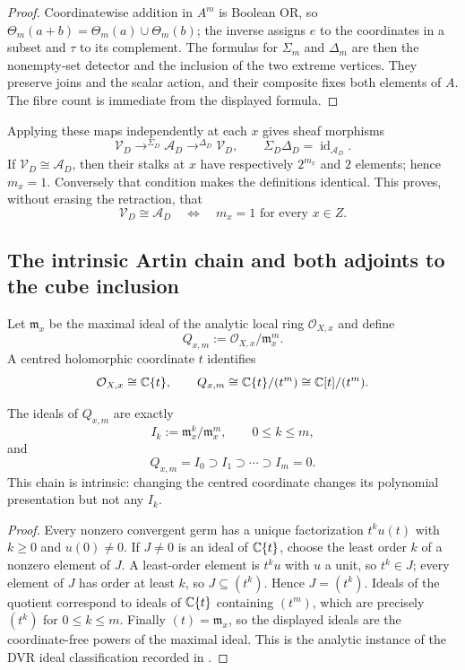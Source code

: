 \begin{proof}
Coordinatewise addition in $A^m$ is Boolean OR, so
$\Theta_m(a+b)=\Theta_m(a)\cup\Theta_m(b)$; the inverse assigns $e$ to the
coordinates in a subset and $\tau$ to its complement.  The formulas for
$\Sigma_m$ and $\Delta_m$ are then the nonempty-set detector and the inclusion
of the two extreme vertices.  They preserve joins and the scalar action, and
their composite fixes both elements of $A$.  The fibre count is immediate from
the displayed formula.
\end{proof}

Applying these maps independently at each $x$ gives sheaf morphisms
\[
 \mathcal V_D\mathop{\longrightarrow}^{\Sigma_D}\mathcal A_D
 \mathop{\longrightarrow}^{\Delta_D}\mathcal V_D,
 \qquad
 \Sigma_D\Delta_D=\operatorname{id}_{\mathcal A_D}.
\]
If $\mathcal V_D\cong\mathcal A_D$, then their stalks at $x$ have respectively
$2^{m_x}$ and $2$ elements; hence $m_x=1$.  Conversely that condition makes
the definitions identical.  This proves, without erasing the retraction, that
\[
 \mathcal V_D\cong\mathcal A_D
 \quad\Longleftrightarrow\quad
 m_x=1\text{ for every }x\in Z.
\]

\subsection{The intrinsic Artin chain and both adjoints to the cube inclusion}

Let $\mathfrak m_x$ be the maximal ideal of the analytic local ring
$\mathcal O_{X,x}$ and define
\[
 Q_{x,m}:=\mathcal O_{X,x}/\mathfrak m_x^m.
\]
A centred holomorphic coordinate $t$ identifies
\[
 \mathcal O_{X,x}\cong\mathbb C\{t\},\qquad
 Q_{x,m}\cong\mathbb C\{t\}/(t^m)\cong\mathbb C[t]/(t^m).
\]

\begin{proposition}
\label{prop:ds-artin-chain}
The ideals of $Q_{x,m}$ are exactly
\[
 I_k:=\mathfrak m_x^k/\mathfrak m_x^m,
 \qquad 0\leq k\leq m,
\]
and
\[
 Q_{x,m}=I_0\supset I_1\supset\cdots\supset I_m=0.
\]
This chain is intrinsic: changing the centred coordinate changes its polynomial
presentation but not any $I_k$.
\end{proposition}

\begin{proof}
Every nonzero convergent germ has a unique factorization $t^ku(t)$ with
$k\geq0$ and $u(0)\ne0$.  If $J\ne0$ is an ideal of $\mathbb C\{t\}$, choose the least
order $k$ of a nonzero element of $J$.  A least-order element is $t^ku$ with
$u$ a unit, so $t^k\in J$; every element of $J$ has order at least $k$, so
$J\subseteq(t^k)$.  Hence $J=(t^k)$.  Ideals of the quotient correspond to ideals
of $\mathbb C\{t\}$ containing $(t^m)$, which are precisely $(t^k)$ for
$0\leq k\leq m$.  Finally $(t)=\mathfrak m_x$, so the displayed ideals are the
coordinate-free powers of the maximal ideal.  This is the analytic instance of
the DVR ideal classification recorded in \cite[\S13.5, especially
Thm.~13.5.4]{vakil2024}.
\end{proof}

